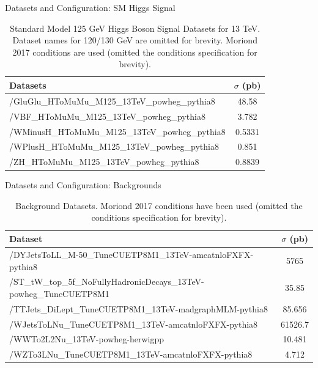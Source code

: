 \documentclass[pdf, 9pt]{beamer}
\begin{document}
  \begin{frame}{Datasets and Configuration: SM Higgs Signal}
    \begin{table}[htb]
    \caption{Standard Model 125 GeV Higgs Boson Signal Datasets for 13 TeV. Dataset names for 120/130 GeV are omitted for brevity. Moriond 2017 conditions are used (omitted the conditions specification for brevity).}
    \label{table:higgs_data_signaldatasets}
    \begin{center}
        \begin{tabular}{ l  c}
            \hline
            Datasets & $\sigma$ (pb)\\
            \hline
            {/GluGlu\_HToMuMu\_M125\_13TeV\_powheg\_pythia8} & 48.58\\
            {/VBF\_HToMuMu\_M125\_13TeV\_powheg\_pythia8} & 3.782\\
            {/WMinusH\_HToMuMu\_M125\_13TeV\_powheg\_pythia8} & 0.5331\\
            {/WPlusH\_HToMuMu\_M125\_13TeV\_powheg\_pythia8} & 0.851\\
            {/ZH\_HToMuMu\_M125\_13TeV\_powheg\_pythia8} & 0.8839 \\
            \hline
        \end{tabular}
    \end{center}
\end{table}
  \end{frame}

  \begin{frame}{Datasets and Configuration: Backgrounds}
    \begin{table}[htb]
    \caption{Background Datasets. Moriond 2017 conditions have been used (omitted the conditions specification for brevity).}
    \label{table:higgs_data_backgrounddatasets}
    \begin{center}
        \begin{tabular}{ l  c}
            \hline
            Dataset & $\sigma$ (pb)\\
            \hline
            \small{/DYJetsToLL\_M-50\_TuneCUETP8M1\_13TeV-amcatnloFXFX-pythia8} & 5765\\
            \small{/ST\_tW\_top\_5f\_NoFullyHadronicDecays\_13TeV-powheg\_TuneCUETP8M1} & 35.85\\
            \small{/TTJets\_DiLept\_TuneCUETP8M1\_13TeV-madgraphMLM-pythia8} & 85.656\\
            \small{/WJetsToLNu\_TuneCUETP8M1\_13TeV-amcatnloFXFX-pythia8} & 61526.7\\
            \small{/WWTo2L2Nu\_13TeV-powheg-herwigpp} & 10.481\\
            \small{/WZTo3LNu\_TuneCUETP8M1\_13TeV-amcatnloFXFX-pythia8} & 4.712\\
            \hline
        \end{tabular}
    \end{center}
    \end{table}
  \end{frame}
\end{document}
